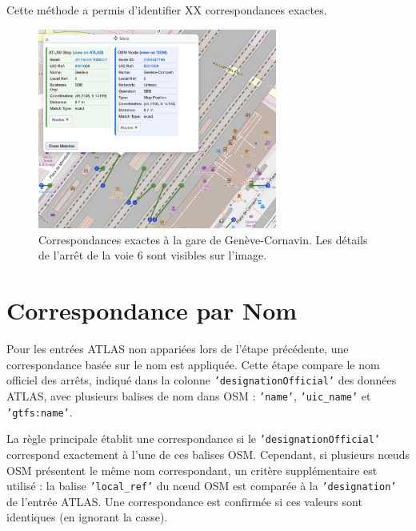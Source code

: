 Cette méthode a permis d'identifier XX correspondances exactes.
\begin{figure}[h] 
    \centering
    \includegraphics[width=0.7\textwidth]{../figures/correspondances/exact_Cornavin.png}
    \caption[Correspondances exactes à Genève-Cornavin]{Correspondances exactes à la gare de Genève-Cornavin. Les détails de l'arrêt de la voie 6 sont visibles sur l'image.}
    \label{fig:exact_cornavin}
\end{figure}

\section{Correspondance par Nom}

Pour les entrées ATLAS non appariées lors de l’étape précédente, une correspondance basée sur le nom est appliquée. Cette étape compare le nom officiel des arrêts, indiqué dans la colonne \texttt{'designationOfficial'} des données ATLAS, avec plusieurs balises de nom dans OSM : \texttt{'name'}, \texttt{'uic\_name'} et \texttt{'gtfs:name'}.

La règle principale établit une correspondance si le \texttt{'designationOfficial'} correspond exactement à l’une de ces balises OSM. Cependant, si plusieurs nœuds OSM présentent le même nom correspondant, un critère supplémentaire est utilisé : la balise \texttt{'local\_ref'} du nœud OSM est comparée à la \texttt{'designation'} de l’entrée ATLAS. Une correspondance est confirmée si ces valeurs sont identiques (en ignorant la casse).

